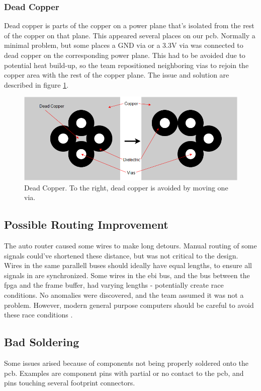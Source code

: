 \subsubsection{Dead Copper}
Dead copper is parts of the copper on a power plane that's isolated from the rest of the copper on that plane. 
This appeared several places on our \gls{pcb}. Normally a minimal problem, but some places a GND via or a 3.3V via was connected to dead copper on the corresponding power plane. 
This had to be avoided due to potential heat build-up, so the team repositioned neighboring vias to rejoin the copper area with the rest of the copper plane. The issue and solution are described in figure \ref{fig:Dead copper}.

\begin{figure}[h!]
\centering
\includegraphics[scale = 0.4]{images/Dead_Copper.png}
\caption{Dead Copper. To the right, dead copper is avoided by moving one via.}
\label{fig:Dead copper}
\end{figure}

\subsection{Possible Routing Improvement}
The auto router caused some wires to make long detours. 
Manual routing of some signals could've shortened these distance, but was not critical to the design. 
Wires in the same parallell buses should ideally have equal lengths, to ensure all signals in are synchronized. 
Some wires in the \gls{ebi} bus, and the bus between the \gls{fpga} and the frame buffer, had varying lengths - potentially create race conditions. 
No anomalies were discovered, and the team assumed it was not a problem. 
However, modern general purpose computers should be careful to avoid these race conditions \cite{race-conditions}.

\subsection{Bad Soldering}
Some issues arised because of components not being properly soldered onto the \gls{pcb}. Examples are component pins with partial or no contact to the \gls{pcb}, and pins touching several footprint connectors.

